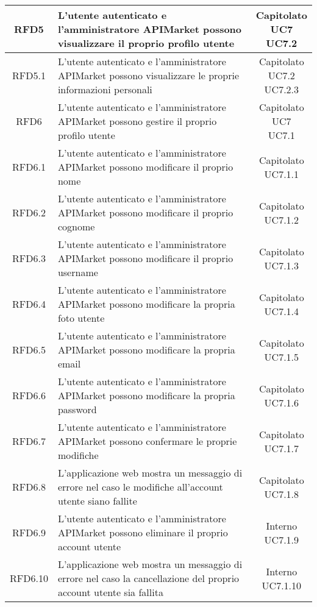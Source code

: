 \begin{longtable}{|c|m{8cm}|c|}
RFD5 & L'utente autenticato e l'amministratore APIMarket possono visualizzare il proprio profilo utente & \makecell*{Capitolato\\UC7\\UC7.2} \\
\hline

RFD5.1 & L'utente autenticato e l'amministratore APIMarket possono visualizzare le proprie informazioni personali & \makecell*{Capitolato\\UC7.2\\UC7.2.3} \\
\hline

RFD6 & L'utente autenticato e l'amministratore APIMarket possono gestire il proprio profilo utente & \makecell*{Capitolato\\UC7\\UC7.1} \\
\hline

RFD6.1 & L'utente autenticato e l'amministratore APIMarket possono modificare il proprio nome & \makecell*{Capitolato\\UC7.1.1} \\
\hline
RFD6.2 & L'utente autenticato e l'amministratore APIMarket possono modificare il proprio cognome & \makecell*{Capitolato\\UC7.1.2} \\
\hline
RFD6.3 & L'utente autenticato e l'amministratore APIMarket possono modificare il proprio username & \makecell*{Capitolato\\UC7.1.3} \\
\hline
RFD6.4 & L'utente autenticato e l'amministratore APIMarket possono modificare la propria foto utente & \makecell*{Capitolato\\UC7.1.4} \\
\hline
RFD6.5 & L'utente autenticato e l'amministratore APIMarket possono modificare la propria email & \makecell*{Capitolato\\UC7.1.5} \\
\hline
RFD6.6 & L'utente autenticato e l'amministratore APIMarket possono modificare la propria password & \makecell*{Capitolato\\UC7.1.6} \\
\hline
RFD6.7 & L'utente autenticato e l'amministratore APIMarket possono confermare le proprie modifiche & \makecell*{Capitolato\\UC7.1.7} \\
\hline
RFD6.8 & L'applicazione web mostra un messaggio di errore nel caso le modifiche all'account utente siano fallite & \makecell*{Capitolato\\UC7.1.8} \\
\hline
RFD6.9 & L'utente autenticato e l'amministratore APIMarket possono eliminare il proprio account utente & \makecell*{Interno\\UC7.1.9} \\
\hline
RFD6.10 & L'applicazione web mostra un messaggio di errore nel caso la cancellazione del proprio account utente sia fallita & \makecell*{Interno\\UC7.1.10} \\
\hline


\end{longtable}
